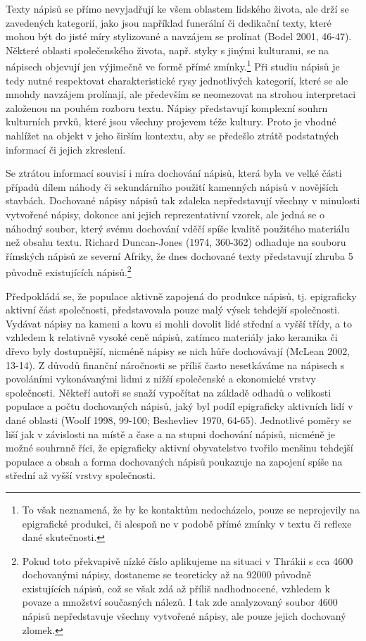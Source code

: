 Texty nápisů se přímo nevyjadřují ke všem oblastem lidského života, ale drží se zavedených kategorií, jako jsou například funerální či dedikační texty, které mohou být do jisté míry stylizované a navzájem se prolínat (Bodel 2001, 46-47). Některé oblasti společenského života, např. styky s jinými kulturami, se na nápisech objevují jen výjimečně ve formě přímé zmínky.\footnote{To však neznamená, že by ke kontaktům nedocházelo, pouze se neprojevily na epigrafické produkci, či alespoň ne v podobě přímé zmínky v textu či reflexe dané skutečnosti.} Při studiu nápisů je tedy nutné respektovat charakteristické rysy jednotlivých kategorií, které se ale mnohdy navzájem prolínají, ale především se neomezovat na strohou interpretaci založenou na pouhém rozboru textu. Nápisy představují komplexní souhrn kulturních prvků, které jsou všechny projevem téže kultury. Proto je vhodné nahlížet na objekt v jeho širším kontextu, aby se předešlo ztrátě podstatných informací či jejich zkreslení.

Se ztrátou informací souvisí i míra dochování nápisů, která byla ve velké části případů dílem náhody či sekundárního použití kamenných nápisů v novějších stavbách. Dochované nápisy nápisů tak zdaleka nepředstavují všechny v minulosti vytvořené nápisy, dokonce ani jejich reprezentativní vzorek, ale jedná se o náhodný soubor, který svému dochování vděčí spíše kvalitě použitého materiálu než obsahu textu. Richard Duncan-Jones (1974, 360-362) odhaduje na souboru římských nápisů ze severní Afriky, že dnes dochované texty představují zhruba 5  původně existujících nápisů.\footnote{Pokud toto překvapivě nízké číslo aplikujeme na situaci v Thrákii s cca 4600 dochovanými nápisy, dostaneme se teoreticky až na 92000 původně existujících nápisů, což se však zdá až příliš nadhodnocené, vzhledem k povaze a množství současných nálezů. I tak zde analyzovaný soubor 4600 nápisů nepředstavuje všechny vytvořené nápisy, ale pouze jejich dochovaný zlomek.}

Předpokládá se, že populace aktivně zapojená do produkce nápisů, tj. epigraficky aktivní část společnosti, představovala pouze malý výsek tehdejší společnosti. Vydávat nápisy na kameni a kovu si mohli dovolit lidé střední a vyšší třídy, a to vzhledem k relativně vysoké ceně nápisů, zatímco materiály jako keramika či dřevo byly dostupnější, nicméně nápisy se nich hůře dochovávají (McLean 2002, 13-14). Z důvodů finanční náročnosti se příliš často nesetkáváme na nápisech s povoláními vykonávanými lidmi z nižší společenské a ekonomické vrstvy společnosti. Někteří autoři se snaží vypočítat na základě odhadů o velikosti populace a počtu dochovaných nápisů, jaký byl podíl epigraficky aktivních lidí v dané oblasti (Woolf 1998, 99-100; Beshevliev 1970, 64-65). Jednotlivé poměry se liší jak v závislosti na místě a čase a na stupni dochování nápisů, nicméně je možné souhrnně říci, že epigraficky aktivní obyvatelstvo tvořilo menšinu tehdejší populace a obsah a forma dochovaných nápisů poukazuje na zapojení spíše na střední až vyšší vrstvy společnosti.

